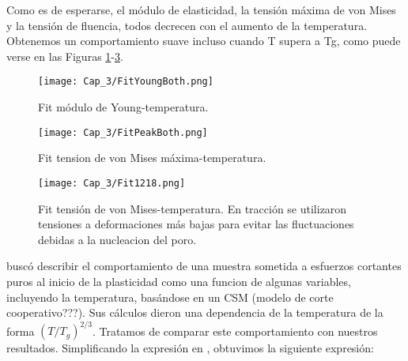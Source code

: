 Como es de esperarse, el módulo de elasticidad, la tensión máxima de von Mises y la tensión de fluencia, todos decrecen con el aumento de la temperatura. Obtenemos un comportamiento suave incluso cuando T supera a Tg, como puede verse en las Figuras \ref{C3:fg:youngVsT}-\ref{C3:fg:peakVMises1218VsT}.


\begin{figure}[htp]
\centering
\texttt{[image: Cap\_3/FitYoungBoth.png]}
\caption[Fit módulo de Young-temperatura.]{Fit módulo de Young-temperatura.}
\label{C3:fg:youngVsT}
\end{figure}

\begin{figure}[htp]
\centering
\texttt{[image: Cap\_3/FitPeakBoth.png]}
\caption[Fit tension de von Mises máxima-temperatura.]{Fit tension de von Mises máxima-temperatura.}
\label{C3:fg:peakVMisesVsT}
\end{figure}

\begin{figure}[htp]
\centering
\texttt{[image: Cap\_3/Fit1218.png]}
\caption[Fit tensión de von Mises-temperatura.]{Fit tensión de von Mises-temperatura. En tracción se utilizaron tensiones a deformaciones más bajas para evitar las fluctuaciones debidas a la nucleacion del poro.}
\label{C3:fg:peakVMises1218VsT}
\end{figure} 

\cite{cheng11} buscó describir el comportamiento de una muestra sometida a esfuerzos cortantes puros al inicio de la plasticidad  como una funcion de algunas variables, incluyendo la temperatura, basándose en un CSM (modelo de corte cooperativo???). Sus cálculos dieron una dependencia de la temperatura de la forma $(T/T_g)^{2/3}$. Tratamos de comparar este comportamiento con nuestros resultados. Simplificando la expresión en \cite{cheng11}, obtuvimos la siguiente expresión:


